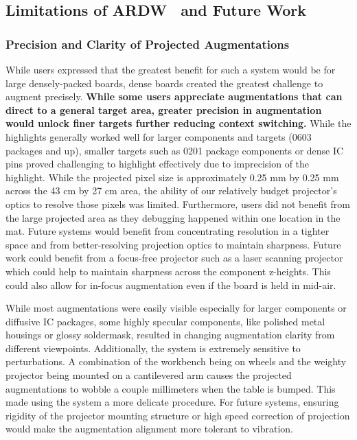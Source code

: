 \documentclass [11pt, proquest] {uwthesis}[2020/02/24]
\newcommand{\ARDWname}{ARDW}
\begin{document}
\subsection{Limitations of \ARDWname~ and Future Work}
\label{sec:limitations}

\subsubsection{Precision and Clarity of Projected Augmentations}

While users expressed that the greatest benefit for such a system would be for large densely-packed boards, dense boards created the greatest challenge to augment precisely. \textbf{While some users appreciate augmentations that can direct to a general target area, greater precision in augmentation would unlock finer targets further reducing context switching.}
While the highlights generally worked well for larger components and targets (0603 packages and up), smaller targets such as 0201 package components or dense IC pins proved challenging to highlight effectively due to imprecision of the highlight. While the projected pixel size is approximately 0.25 mm by 0.25 mm across the 43 cm by 27 cm area, the ability of our relatively budget projector's optics to resolve those pixels was limited. Furthermore, users did not benefit from the large projected area as they debugging happened within one location in the mat. Future systems would benefit from concentrating resolution in a tighter space and from better-resolving projection optics to maintain sharpness. Future work could benefit from a focus-free projector such as a laser scanning projector which could help to maintain sharpness across the component z-heights.
{This could also allow for in-focus augmentation even if the board is held in mid-air.}

While most augmentations were easily visible especially for larger components or diffusive IC packages, some highly specular components, like polished metal housings or glossy soldermask, resulted in changing augmentation clarity from different viewpoints.
Additionally, the system is extremely sensitive to perturbations. A combination of the workbench being on wheels and the weighty projector being mounted on a cantilevered arm causes the projected augmentations to wobble a couple millimeters when the table is bumped. This made using the system a more delicate procedure. For future systems, ensuring rigidity of the projector mounting structure or high speed correction of projection would make the augmentation alignment more tolerant to vibration.
\end{document}
